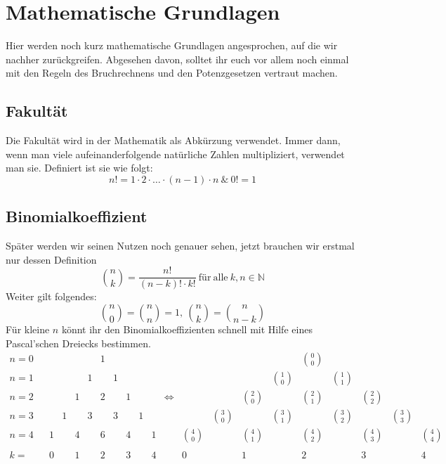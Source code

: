 \section{Mathematische Grundlagen}
	Hier werden noch kurz mathematische Grundlagen angesprochen, auf die wir
	nachher zurückgreifen. Abgesehen davon, solltet ihr euch vor allem noch einmal
	mit den Regeln des Bruchrechnens und den Potenzgesetzen vertraut machen.

	\subsection{Fakultät}
		Die Fakultät wird in der Mathematik als Abkürzung verwendet. Immer dann, wenn
		man viele aufeinanderfolgende natürliche Zahlen multipliziert, verwendet man
		sie. Definiert ist sie wie folgt:
		\[n!=1\cdot 2\cdot \ldots \cdot (n-1)\cdot n\ \&\ 0!=1\]

	\subsection{Binomialkoeffizient}
		Später werden wir seinen Nutzen noch genauer sehen, jetzt brauchen wir erstmal
		nur dessen Definition
		\[\binom{n}{k}=\frac{n!}{(n-k)!\cdot k!}\mathrm{\ für\ alle\ }k,n\in
		\mathbb{N}\]
		Weiter gilt folgendes:
		\[\binom{n}{0}=\binom{n}{n}=1,\ \binom{n}{k}=\binom{n}{n-k}\]
		Für kleine \(n\) könnt ihr den Binomialkoeffizienten schnell mit Hilfe eines
		Pascal'schen Dreiecks bestimmen.\\
		\(
			\begin{array}{ccccccccccccccccccccc}
				n=0 &  &  &  &  &  & 1 &  &  &  &  &  &  &  &  &  & \binom{0}{0} &  &  &  & \\ 
				n=1 &  &  &  &  & 1 &  & 1 &  &  &  &  &  &  &  & \binom{1}{0} &  &
				\binom{1}{1} &  &  & \\
				n=2 &  &  &  & 1 &  & 2 &  & 1 &  &  & \Leftrightarrow &  &  & \binom{2}{0} & 
				& \binom{2}{1} &  & \binom{2}{2} &  & \\
				n=3 &  &  & 1 &  & 3 &  & 3 &  & 1 &  &  &  & \binom{3}{0} &  & \binom{3}{1} & 
				& \binom{3}{2} &  & \binom{3}{3} & \\
				n=4 &  & 1 &  & 4 &  & 6 &  & 4 &  & 1 &  & \binom{4}{0} &  & \binom{4}{1} & 
				& \binom{4}{2} &  & \binom{4}{3} &  & \binom{4}{4}\\
				 & && && && && && && && && && &\\
				k= & &0& &1& &2& &3& &4& &0& &1& &2& &3& &4   
			\end{array} 
		\)
